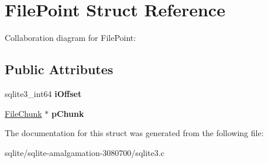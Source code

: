 \hypertarget{struct_file_point}{\section{File\+Point Struct Reference}
\label{struct_file_point}
}


Collaboration diagram for File\+Point\+:
\subsection*{Public Attributes}
\begin{DoxyCompactItemize}
\item 
\hypertarget{struct_file_point_a00a345e479cd37ebeb9e6ed475eb4112}{sqlite3\+\_\+int64 {\bfseries i\+Offset}}\label{struct_file_point_a00a345e479cd37ebeb9e6ed475eb4112}

\item 
\hypertarget{struct_file_point_aa17216d9d2559f14a00a2c72a8959298}{\hyperlink{struct_file_chunk}{File\+Chunk} $\ast$ {\bfseries p\+Chunk}}\label{struct_file_point_aa17216d9d2559f14a00a2c72a8959298}

\end{DoxyCompactItemize}


The documentation for this struct was generated from the following file\+:\begin{DoxyCompactItemize}
\item 
sqlite/sqlite-\/amalgamation-\/3080700/sqlite3.\+c\end{DoxyCompactItemize}
